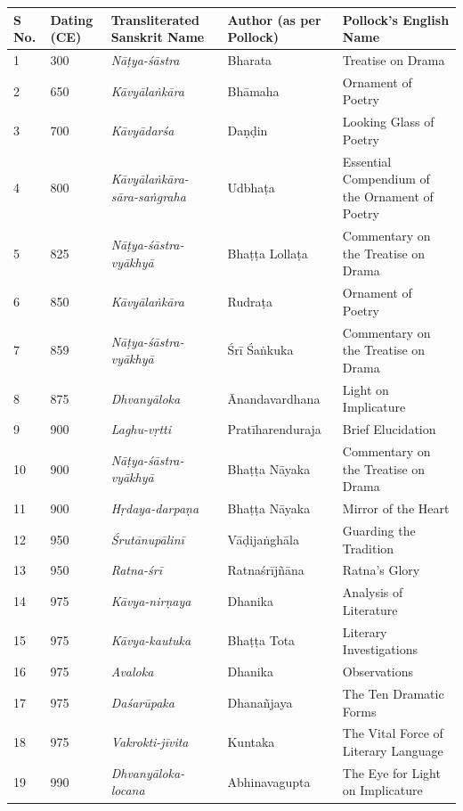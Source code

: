 \begin{longtable}{|l|p{1.1cm}|p{1.98cm}|p{1.98cm}|p{1.98cm}|}
\hline
S No. & Dating (CE) & Transliterated Sanskrit Name & Author (as per Pollock) & Pollock’s English Name \\
\hline
1 & 300 & \textit{Nāṭya-śāstra} & Bharata & Treatise on Drama \\
\hline
2 & 650 & \textit{Kāvyālaṅkāra} & Bhāmaha & Ornament of Poetry \\
\hline
3 & 700 & \textit{Kāvyādarśa} & Daṇḍin & Looking Glass of Poetry \\
\hline
4 & 800 & \textit{Kāvyālaṅkāra-sāra-saṅgraha} & Udbhaṭa & Essential Compendium of the Ornament of Poetry \\
\hline
5 & 825 & \textit{Nāṭya-śāstra-vyākhyā} & Bhaṭṭa Lollaṭa & Commentary on the Treatise on Drama \\
\hline
6 & 850 & \textit{Kāvyālaṅkāra} & Rudraṭa & Ornament of Poetry \\
\hline
7 & 859 & \textit{Nāṭya-śāstra-vyākhyā} & Śrī Śaṅkuka & Commentary on the Treatise on Drama \\
\hline
8 & 875 & \textit{Dhvanyāloka} & Ānandavar\-dhana & Light on Implicature \\
\hline
9 & 900 & \textit{Laghu-vṛtti} & Pratīharendu\-raja & Brief Elucidation \\
\hline
10 & 900 & \textit{Nāṭya-śāstra-vyākhyā} & Bhaṭṭa Nāyaka & Commentary on the Treatise on Drama \\
\hline
11 & 900 & \textit{Hṛdaya-darpaṇa} & Bhaṭṭa Nāyaka & Mirror of the Heart \\
\hline
12 & 950 & \textit{Śrutānupālinī} & Vāḍijaṅghāla & Guarding the Tradition \\
\hline
13 & 950 & \textit{Ratna-śrī} & Ratnaśrījñāna & Ratna’s Glory \\
\hline
14 & 975 & \textit{Kāvya-nirṇaya} & Dhanika & Analysis of Literature \\
\hline
15 & 975 & \textit{Kāvya-kautuka} & Bhaṭṭa Tota & Literary Investigations \\
\hline
16 & 975 & \textit{Avaloka} & Dhanika & Observations \\
\hline
17 & 975 & \textit{Daśarūpaka} & Dhanañjaya & The Ten Dramatic Forms \\
\hline
18 & 975 & \textit{Vakrokti-jīvita} & Kuntaka & The Vital Force of Literary Language \\
\hline
19 & 990 & \textit{Dhvanyāloka-locana} & Abhinavagupta & The Eye for Light on Implicature \\

\end{longtable}
